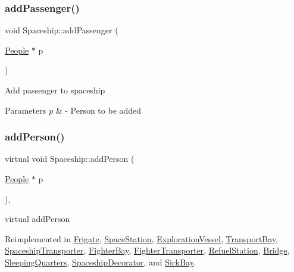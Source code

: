 \subsubsection{\texorpdfstring{add\+Passenger()}{addPassenger()}}
{\footnotesize\ttfamily void Spaceship\+::add\+Passenger (\begin{DoxyParamCaption}\item[{\hyperlink{classPeople}{People} $\ast$}]{p }\end{DoxyParamCaption})\hspace{0.3cm}{\ttfamily [virtual]}}

Add passenger to spaceship 
\begin{DoxyParams}{Parameters}
{\em p} & -\/ Person to be added \\
\hline
\end{DoxyParams}
\mbox{\label{classSpaceship_add8d9c6dfd5f6ecb8399e41e71e5b22f}} 
\subsubsection{\texorpdfstring{add\+Person()}{addPerson()}}
{\footnotesize\ttfamily virtual void Spaceship\+::add\+Person (\begin{DoxyParamCaption}\item[{\hyperlink{classPeople}{People} $\ast$}]{p }\end{DoxyParamCaption})\hspace{0.3cm}{\ttfamily [inline]}, {\ttfamily [virtual]}}

virtual add\+Person 

Reimplemented in \hyperlink{classFrigate_a5da866e084d1d07363f06ff052005b41}{Frigate}, \hyperlink{classSpaceStation_a46146c02fcd8107eda2972cc5843afd8}{Space\+Station}, \hyperlink{classExplorationVessel_a7be654e42a9e83800abfb897d9b308b8}{Exploration\+Vessel}, \hyperlink{classTransportBay_a2be08f6085583ec9f839ff8939c6a6b7}{Transport\+Bay}, \hyperlink{classSpaceshipTransporter_a5c9ee82688e97545baa7a876e69d5dd3}{Spaceship\+Transporter}, \hyperlink{classFighterBay_aa0777fe7c8a3e6b772fc8bf58a3cb9bb}{Fighter\+Bay}, \hyperlink{classFighterTransporter_a79b9099ea2cbdd17d1a0d6c8122e9bfa}{Fighter\+Transporter}, \hyperlink{classRefuelStation_a6bd40214cf5dc4d46739943f545c6d7a}{Refuel\+Station}, \hyperlink{classBridge_aec10bfb9af885933640548b509144a29}{Bridge}, \hyperlink{classSleepingQuarters_addd107a8005b61d51846e8e955922d50}{Sleeping\+Quarters}, \hyperlink{classSpaceshipDecorator_a6e289d8a65f35b9f223255ae0eaa3b00}{Spaceship\+Decorator}, and \hyperlink{classSickBay_a3934a1b821fbd192a946a9aff4575afa}{Sick\+Bay}.


